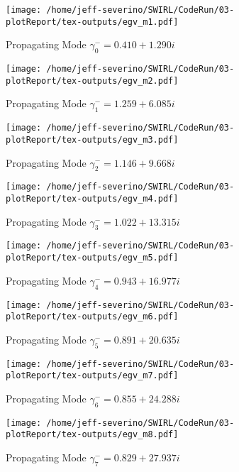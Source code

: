 \documentclass[a4paper]{article}
\begin{document}
 \begin{figure}
     \centering
     \texttt{[image: /home/jeff-severino/SWIRL/CodeRun/03-plotReport/tex-outputs/egv\_m1.pdf]}
     \caption{Propagating Mode $\gamma^-_0 = 0.410 + 1.290i$}
     \label{fig:11} 
 \end{figure}


 \begin{figure}
     \centering
     \texttt{[image: /home/jeff-severino/SWIRL/CodeRun/03-plotReport/tex-outputs/egv\_m2.pdf]}
     \caption{Propagating Mode $\gamma^-_1 =1.259 + 6.085i $}
     \label{fig:12} 
 \end{figure}


 \begin{figure}
     \centering
     \texttt{[image: /home/jeff-severino/SWIRL/CodeRun/03-plotReport/tex-outputs/egv\_m3.pdf]}
     \caption{Propagating Mode $\gamma^-_2 =1.146 + 9.668i $}
     \label{fig:13} 
 \end{figure}


 \begin{figure}
     \centering
     \texttt{[image: /home/jeff-severino/SWIRL/CodeRun/03-plotReport/tex-outputs/egv\_m4.pdf]}
     \caption{Propagating Mode $\gamma^-_3 =1.022 + 13.315i$}
     \label{fig:14} 
 \end{figure}


 \begin{figure}
     \centering
     \texttt{[image: /home/jeff-severino/SWIRL/CodeRun/03-plotReport/tex-outputs/egv\_m5.pdf]}
     \caption{Propagating Mode $\gamma^-_4 = 0.943 + 16.977i$}
     \label{fig:15} 
 \end{figure}


 \begin{figure}
     \centering
     \texttt{[image: /home/jeff-severino/SWIRL/CodeRun/03-plotReport/tex-outputs/egv\_m6.pdf]}
     \caption{Propagating Mode $\gamma^-_5 =0.891 + 20.635i$}
     \label{fig:16} 
 \end{figure}


 \begin{figure}
     \centering
     \texttt{[image: /home/jeff-severino/SWIRL/CodeRun/03-plotReport/tex-outputs/egv\_m7.pdf]}
     \caption{Propagating Mode $\gamma^-_6 =0.855 + 24.288i $}
     \label{fig:17} 
 \end{figure}

 \begin{figure}
     \centering
     \texttt{[image: /home/jeff-severino/SWIRL/CodeRun/03-plotReport/tex-outputs/egv\_m8.pdf]}
     \caption{Propagating Mode $\gamma^-_7 = 0.829 + 27.937i$}
     \label{fig:18} 
 \end{figure}
\end{document}
